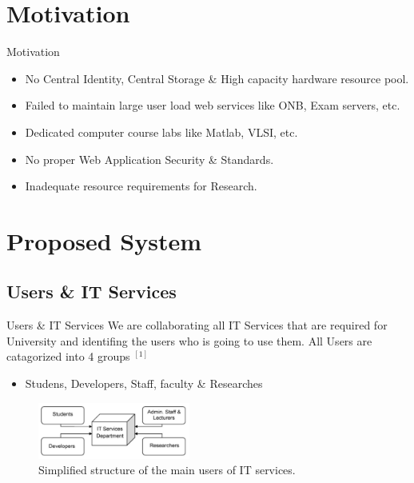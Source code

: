 \documentclass[10pt,xcolor=dvipsnames]{beamer}
\begin{document}
\section{Motivation}
\begin{frame}{Motivation}

\begin{itemize}
	\item No Central Identity, Central Storage \& High capacity hardware resource pool.
	\item Failed to maintain large user load web services like ONB, Exam servers, etc.
	\item Dedicated computer course labs like Matlab, VLSI, etc.
	\item No proper Web Application Security \& Standards.
	\item Inadequate resource requirements for Research.
\end{itemize}

\end{frame}



\section{Proposed System}
\subsection{Users \& IT Services}
\begin{frame}{Users \& IT Services}
We are collaborating all IT Services that are required for University and identifing the users who is going to use them. All Users are catagorized into 4 groups $ ^{[1]}$
	
	\begin{itemize}
	\item Studens, Developers, Staff, faculty \& Researches
	\end{itemize}
\begin{figure}[H]
\begin{center}
\includegraphics[width=5cm]{./it.png}
\caption{ Simplified structure of the main users of IT services. \label{fig:Simplified structure of the main users of IT services. }}
\end{center}
\end{figure}
	
\end{frame}
\end{document}
